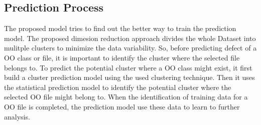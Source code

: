 \documentclass[12pt]{report}
\begin{document}
	
	
\subsection{Prediction Process}

%
%

The proposed model tries to find out the better way to train the prediction model. The proposed dimesion reduction approach divides the whole Dataset into mulitple clusters to minimize the data variability. So, before predicting defect of a OO class or file, it is important to identify the cluster where the selected file belongs to. To predict the potential cluster where a OO class might exist, it first build a cluster prediction model using the used clustering technique. Then it uses the statistical prediction model to identify the potential cluster where the selected OO file might belong to. When the identification of training data for a OO file is completed, the prediction model use these data to learn to further analysis.
%
\end{document}
